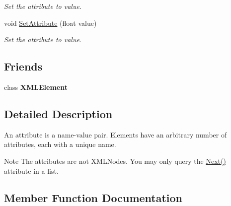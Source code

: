 \begin{DoxyCompactItemize}
\begin{DoxyCompactList}\small\item\em Set the attribute to value. \end{DoxyCompactList}\item 
\hypertarget{classtinyxml2_1_1_x_m_l_attribute_ae95e843313aaf5d56c32530b6456df02}{}void \hyperlink{classtinyxml2_1_1_x_m_l_attribute_ae95e843313aaf5d56c32530b6456df02}{Set\+Attribute} (float value)\label{classtinyxml2_1_1_x_m_l_attribute_ae95e843313aaf5d56c32530b6456df02}

\begin{DoxyCompactList}\small\item\em Set the attribute to value. \end{DoxyCompactList}\end{DoxyCompactItemize}
\subsection*{Friends}
\begin{DoxyCompactItemize}
\item 
\hypertarget{classtinyxml2_1_1_x_m_l_attribute_ac2fba9b6e452829dd892f7392c24e0eb}{}class {\bfseries X\+M\+L\+Element}\label{classtinyxml2_1_1_x_m_l_attribute_ac2fba9b6e452829dd892f7392c24e0eb}

\end{DoxyCompactItemize}


\subsection{Detailed Description}
An attribute is a name-\/value pair. Elements have an arbitrary number of attributes, each with a unique name.

\begin{DoxyNote}{Note}
The attributes are not X\+M\+L\+Nodes. You may only query the \hyperlink{classtinyxml2_1_1_x_m_l_attribute_a7fd852d6185af90361ec1bc9a7681ad6}{Next()} attribute in a list. 
\end{DoxyNote}


\subsection{Member Function Documentation}
\hypertarget{classtinyxml2_1_1_x_m_l_attribute_a949d02a5888092cc68c1e29185301863}{}

